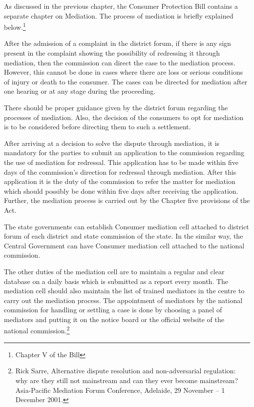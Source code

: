 \begin{multicols}{2}
\vspace{-.2cm}

\noi
As discussed in the previous chapter, the Consumer Protection Bill contains a separate chapter
on Mediation. The process of mediation is briefly explained below.\footnote{Chapter V of the Bill}

\noi
After the admission of a complaint in the district forum, if there is any sign present in the
complaint showing the possibility of redressing it through mediation, then the commission can
direct the case to the mediation process. However, this cannot be done in cases where there are
loss or serious conditions of injury or death to the consumer. The cases can be directed for
mediation after one hearing or at any stage during the proceeding.

\noi
There should be proper guidance given by the district forum regarding the processes of
mediation. Also, the decision of the consumers to opt for mediation is to be considered before
directing them to such a settlement.

\vspace{.1cm}

\noi
After arriving at a decision to solve the dispute through mediation, it is mandatory for the
parties to submit an application to the commission regarding the use of mediation for redressal.
This application has to be made within five days of the commission’s direction for redressal
through mediation. After this application it is the duty of the commission to refer the matter for
mediation which should possibly be done within five days after receiving the application.
Further, the mediation process is carried out by the Chapter five provisions of the Act.

\vspace{.1cm}

\noi
The state governments can establish Consumer mediation cell attached to district forum of each
district and state commission of the state. In the similar way, the Central Government can have
Consumer mediation cell attached to the national commission.

\noi
The other duties of the mediation cell are to maintain a regular and clear database on a daily
basis which is submitted as a report every month. The mediation cell should also maintain the
list of trained mediators in the centre to carry out the mediation process. The appointment of
mediators by the national commission for handling or settling a case is done by choosing a
panel of mediators and putting it on the notice board or the official website of the national
commission.\footnote{Rick Sarre, Alternative dispute resolution and non-adversarial regulation: why are they still not mainstream and can they ever become mainstream? Asia-Pacific Mediation Forum Conference, Adelaide, 29 November – 1 December 2001.}


\end{multicols}
